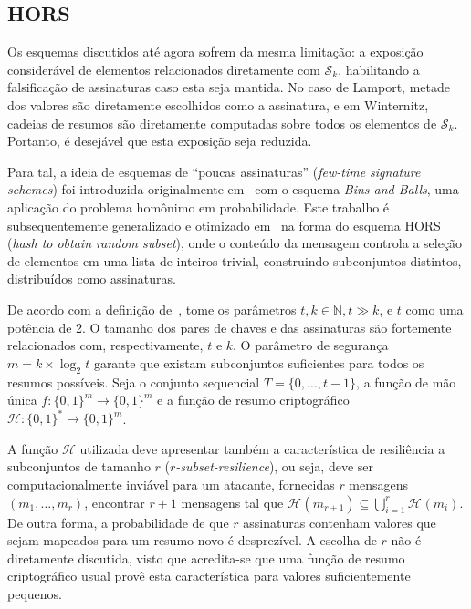 \documentclass[12pt,notitlepage]{report}
\newcommand{\hh}{\mathcal{H}}
\newcommand{\sk}{\mathcal{S}_k}
\newcommand{\hash}[2][]{\mathcal{H}^{#1}(#2)}
\newcommand{\binwds}[1]{\{0, 1\}^{#1}}
\newcommand{\fhash}[1]{\hh{} : \binwds{*} \longrightarrow \binwds{#1}}
\begin{document}
\subsection{HORS}

Os esquemas discutidos até agora sofrem da mesma limitação: a exposição
considerável de elementos relacionados diretamente com $\sk{}$, habilitando
a falsificação de assinaturas caso esta seja mantida. No caso de Lamport, metade
dos valores são diretamente escolhidos como a assinatura, e em Winternitz,
cadeias de resumos são diretamente computadas sobre todos os elementos de $\sk{}$. Portanto,
é desejável que esta exposição seja reduzida.

Para tal, a ideia de esquemas de ``poucas assinaturas'' (\emph{few-time signature
schemes}) foi introduzida originalmente em~\cite{Perrig:2001:BOS:501983.501988}
com o esquema \emph{Bins and Balls}, uma aplicação do problema homônimo em
probabilidade. Este trabalho é subsequentemente generalizado e otimizado
em~\cite{Reyzin:2002:BBS:646039.678322} na forma do esquema HORS
(\emph{hash to obtain random subset}), onde o conteúdo da mensagem controla a
seleção de elementos em uma lista de inteiros trivial, construindo subconjuntos
distintos, distribuídos como assinaturas.

De acordo com a definição de~\cite{Reyzin:2002:BBS:646039.678322}, tome
os parâmetros $t, k \in \mathbb{N}, t \gg k$, e $t$ como uma potência de 2.
O tamanho dos pares de chaves e das assinaturas são fortemente relacionados
com, respectivamente, $t$ e $k$. O parâmetro de segurança
$m = k \times \log_2 t$ garante que existam subconjuntos suficientes para
todos os resumos possíveis. Seja o conjunto sequencial $T = \{0, \dots, t - 1\}$, a função de mão única $f : \binwds{m} \longrightarrow \binwds{m}$ e a função de resumo criptográfico $\fhash{m}$.

A função $\hh{}$ utilizada deve apresentar também a característica de
resiliência a subconjuntos de tamanho $r$ (\emph{$r$-subset-resilience}), ou seja, deve ser computacionalmente inviável
para um atacante, fornecidas $r$ mensagens $(m_1, \dots, m_r)$, encontrar
$r + 1$ mensagens tal que $\hash{m_{r + 1}} \subseteq \bigcup^{r}_{i = 1} \hash{m_i}$. De outra forma, a probabilidade de que $r$ assinaturas contenham valores que sejam mapeados para um resumo novo é desprezível.
A escolha de $r$ não é diretamente discutida, visto que acredita-se que uma função de resumo criptográfico usual provê esta característica para valores suficientemente pequenos.
\end{document}
